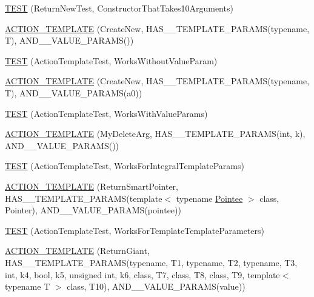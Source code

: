 \begin{DoxyCompactItemize}
\hyperlink{namespacetesting_1_1gmock__generated__actions__test_a1ed6392f4aeb68b9429ff7dd98ce5a86}{T\+E\+ST} (Return\+New\+Test, Constructor\+That\+Takes10\+Arguments)
\item 
\hyperlink{namespacetesting_1_1gmock__generated__actions__test_a1debc0726715951fcd7f5443e436dc46}{A\+C\+T\+I\+O\+N\+\_\+\+T\+E\+M\+P\+L\+A\+TE} (Create\+New, H\+A\+S\+\_\+\_\+\+T\+E\+M\+P\+L\+A\+T\+E\+\_\+\+P\+A\+R\+A\+MS(typename, T), A\+N\+D\+\_\+\_\+\+V\+A\+L\+U\+E\+\_\+\+P\+A\+R\+A\+MS())
\item 
\hyperlink{namespacetesting_1_1gmock__generated__actions__test_aaac879cbe00638dcc2d4733760180a4f}{T\+E\+ST} (Action\+Template\+Test, Works\+Without\+Value\+Param)
\item 
\hyperlink{namespacetesting_1_1gmock__generated__actions__test_a38fb8047f95126bb0b2cfe7e670c8af7}{A\+C\+T\+I\+O\+N\+\_\+\+T\+E\+M\+P\+L\+A\+TE} (Create\+New, H\+A\+S\+\_\+\_\+\+T\+E\+M\+P\+L\+A\+T\+E\+\_\+\+P\+A\+R\+A\+MS(typename, T), A\+N\+D\+\_\+\_\+\+V\+A\+L\+U\+E\+\_\+\+P\+A\+R\+A\+MS(a0))
\item 
\hyperlink{namespacetesting_1_1gmock__generated__actions__test_a21f6e2ad5c4c1afecca93a42c9a84f1a}{T\+E\+ST} (Action\+Template\+Test, Works\+With\+Value\+Params)
\item 
\hyperlink{namespacetesting_1_1gmock__generated__actions__test_aaaac0fbf0bf2c7bd8fc104310e6af25c}{A\+C\+T\+I\+O\+N\+\_\+\+T\+E\+M\+P\+L\+A\+TE} (My\+Delete\+Arg, H\+A\+S\+\_\+\_\+\+T\+E\+M\+P\+L\+A\+T\+E\+\_\+\+P\+A\+R\+A\+MS(int, k), A\+N\+D\+\_\+\_\+\+V\+A\+L\+U\+E\+\_\+\+P\+A\+R\+A\+MS())
\item 
\hyperlink{namespacetesting_1_1gmock__generated__actions__test_aad8d77a35ac21f366dc334a45cf5b140}{T\+E\+ST} (Action\+Template\+Test, Works\+For\+Integral\+Template\+Params)
\item 
\hyperlink{namespacetesting_1_1gmock__generated__actions__test_ad99d926be507eb0c031538da2e8bb838}{A\+C\+T\+I\+O\+N\+\_\+\+T\+E\+M\+P\+L\+A\+TE} (Return\+Smart\+Pointer, H\+A\+S\+\_\+\_\+\+T\+E\+M\+P\+L\+A\+T\+E\+\_\+\+P\+A\+R\+A\+MS(template$<$ typename \hyperlink{namespacetesting_a5122ca3533f3a00f67e146dd81f3b68c}{Pointee} $>$ class, Pointer), A\+N\+D\+\_\+\_\+\+V\+A\+L\+U\+E\+\_\+\+P\+A\+R\+A\+MS(pointee))
\item 
\hyperlink{namespacetesting_1_1gmock__generated__actions__test_a8908d6badc9054adebdaf5ed8d455c2d}{T\+E\+ST} (Action\+Template\+Test, Works\+For\+Template\+Template\+Parameters)
\item 
\hyperlink{namespacetesting_1_1gmock__generated__actions__test_aea61dba8f93605f3e8c1cdedfd1079f5}{A\+C\+T\+I\+O\+N\+\_\+\+T\+E\+M\+P\+L\+A\+TE} (Return\+Giant, H\+A\+S\+\_\+\_\+\+T\+E\+M\+P\+L\+A\+T\+E\+\_\+\+P\+A\+R\+A\+MS(typename, T1, typename, T2, typename, T3, int, k4, bool, k5, unsigned int, k6, class, T7, class, T8, class, T9, template$<$ typename T $>$ class, T10), A\+N\+D\+\_\+\_\+\+V\+A\+L\+U\+E\+\_\+\+P\+A\+R\+A\+MS(value))

\end{DoxyCompactItemize}
